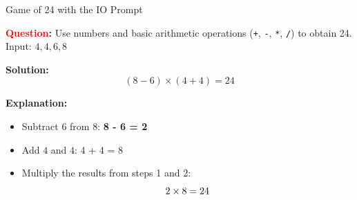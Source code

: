 \documentclass[aspectratio=169, xcolor={dvipsnames}, 10pt, brazil]{beamer}
\begin{document}
\begin{frame}{Game of 24 with the IO Prompt }
    \begin{tcolorbox}[
        colback=blue!10!white, 
        colframe=blue!70!black, 
        title=\textbf{\small Prompt}, 
        fonttitle=\bfseries\small, 
        coltitle=white, 
        boxrule=0.72mm, 
        sharp corners=southwest, 
        enhanced, 
        width=\textwidth-1.8cm, 
        enlarge left by=0.72cm
    ]
        
        \textbf{\small \textcolor{red}{Question}:}  
        Use numbers and basic arithmetic operations (\texttt{+}, \texttt{-}, \texttt{*}, \texttt{/}) to obtain 24.  
        Input: \( 4, 4, 6, 8 \)
        
        \vspace{0.54cm}
        
        \textbf{\small Solution:}  
        \[
        (8 - 6) \times (4 + 4) = 24
        \]

        \vspace{0.54cm}

        \textbf{\small Explanation:}
        \begin{itemize}
            \item \small Subtract \( 6 \) from \( 8 \):  \hspace{.45cm} 
            \textbf{\small 8 - 6 = 2}
            
            \item \small Add \( 4 \) and \( 4 \):  \hspace{1.35cm}\small 4 + 4 = 8
            \item \small Multiply the results from steps 1 and 2:  
            \[
            \small 2 \times 8 = 24
            \]
        \end{itemize}

    \end{tcolorbox}
\end{frame}
\end{document}
